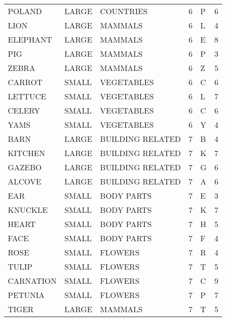 \begin{tabular}{lllrlr}
      POLAND & LARGE &        COUNTRIES &        6 &            P &       6 \\
        LION & LARGE &          MAMMALS &        6 &            L &       4 \\
    ELEPHANT & LARGE &          MAMMALS &        6 &            E &       8 \\
         PIG & LARGE &          MAMMALS &        6 &            P &       3 \\
       ZEBRA & LARGE &          MAMMALS &        6 &            Z &       5 \\
      CARROT & SMALL &       VEGETABLES &        6 &            C &       6 \\
     LETTUCE & SMALL &       VEGETABLES &        6 &            L &       7 \\
      CELERY & SMALL &       VEGETABLES &        6 &            C &       6 \\
        YAMS & SMALL &       VEGETABLES &        6 &            Y &       4 \\
        BARN & LARGE & BUILDING RELATED &        7 &            B &       4 \\
     KITCHEN & LARGE & BUILDING RELATED &        7 &            K &       7 \\
      GAZEBO & LARGE & BUILDING RELATED &        7 &            G &       6 \\
      ALCOVE & LARGE & BUILDING RELATED &        7 &            A &       6 \\
         EAR & SMALL &       BODY PARTS &        7 &            E &       3 \\
     KNUCKLE & SMALL &       BODY PARTS &        7 &            K &       7 \\
       HEART & SMALL &       BODY PARTS &        7 &            H &       5 \\
        FACE & SMALL &       BODY PARTS &        7 &            F &       4 \\
        ROSE & SMALL &          FLOWERS &        7 &            R &       4 \\
       TULIP & SMALL &          FLOWERS &        7 &            T &       5 \\
   CARNATION & SMALL &          FLOWERS &        7 &            C &       9 \\
     PETUNIA & SMALL &          FLOWERS &        7 &            P &       7 \\
       TIGER & LARGE &          MAMMALS &        7 &            T &       5 \\

\end{tabular}
